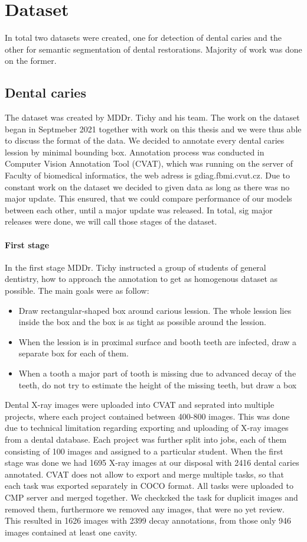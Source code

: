 \chapter{Dataset}
In total two datasets were created, one for detection of dental caries and the other for semantic segmentation of dental restorations. Majority of work was done on the former.
\section{Dental caries}
The dataset was created by MDDr. Tichy and his team. The work on the dataset began in Septmeber 2021 together with work on this thesis and we were thus able to discuss the format of the data. We decided to annotate every dental caries lession by minimal bounding box. Annotation process was conducted in Computer Vision Annotation Tool (CVAT), which was running on the server of Faculty of biomedical informatics, the web adress is gdiag.fbmi.cvut.cz.
\newline
Due to constant work on the dataset we decided to given data as long as there was no major update. This ensured, that we could compare performance of our models between each other, until a major update was released. In total, sig major releases were done, we will call those stages of the dataset.

\subsubsection{First stage}
In the first stage MDDr. Tichy instructed a group of students of general dentistry, how to approach the annotation to get as homogenous dataset as possible. The main goals were as follow:
\begin{itemize}
    \item Draw rectangular-shaped box around carious lession. The whole lession lies inside the box and the box is as tight as possible around the lession.
    \item When the lession is in proximal surface and booth teeth are infected, draw a separate box for each of them.
    \item When a tooth a major part of tooth is missing due to advanced decay of the teeth, do not try to estimate the height of the missing teeth, but draw a box
\end{itemize}
Dental X-ray images were uploaded into CVAT and seprated into multiple projects, where each project contained between 400-800 images. This was done due to technical limitation regarding exporting and uploading of X-ray images from a dental database. Each project was further split into jobs, each of them consisting of 100 images and assigned to a particular student. When the first stage was done we had 1695 X-ray images at our disposal with 2416 dental caries annotated. CVAT does not allow to export and merge multiple tasks, so that each task was exported separately in COCO format. All tasks were uploaded to CMP server and merged together. We checkcked the task for duplicit images and removed them, furthermore we removed any images, that were no yet review. This resulted in 1626 images with 2399 decay annotations, from those only 946 images contained at least one cavity.


